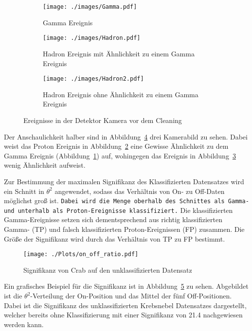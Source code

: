 \begin{figure}[H]
  \centering
\begin{subfigure}[t]{0.3\textwidth}
  \centering
  \texttt{[image: ./images/Gamma.pdf]}
  \caption{Gamma Ereignis}
  \label{fig:gammaevent}
\end{subfigure}
\begin{subfigure}[t]{0.3\textwidth}
  \centering
  \texttt{[image: ./images/Hadron.pdf]}
  \caption{Hadron Ereignis mit Ähnlichkeit zu einem Gamma Ereignis}
  \label{fig:hadevent}
\end{subfigure}
\begin{subfigure}[t]{0.3\textwidth}
  \centering
  \texttt{[image: ./images/Hadron2.pdf]}
  \caption{Hadron Ereignis ohne Ähnlichkeit zu einem Gamma Ereignis}
  \label{fig:had2event}
\end{subfigure}
\caption{Ereignisse in der Detektor Kamera vor dem Cleaning \cite{campic}}
\label{fig:picevents}
\end{figure}
Der Anschaulichkeit halber sind in Abbildung~\ref{fig:picevents} drei Kamerabild zu sehen.
Dabei weist das Proton Ereignis in Abbildung~\ref{fig:hadevent} eine Gewisse Ähnlichkeit zu dem Gamma Ereignis (Abbildung~\ref{fig:gammaevent}) auf, wohingegen das Ereignis in Abbildung~\ref{fig:had2event} wenig Ähnlichkeit aufweist.

Zur Bestimmung der maximalen Signifikanz des Klassifizierten Datensatzes wird ein Schnitt in $\theta^{2}$ angewendet, sodass das Verhältnis von On- zu Off-Daten möglichst groß ist.
\texttt{Dabei wird die Menge oberhalb des Schnittes als Gamma- und unterhalb als Proton-Ereignisse klassifiziert.} 
Die klassifizierten Gamma-Ereignisse setzen sich dementsprechend aus richtig klassifizierten Gamma- (TP) und falsch klassifizierten Proton-Ereignissen (FP) zusammen. 
Die Größe der Signifikanz wird durch das Verhältnis von TP zu FP bestimmt.
\begin{figure}[H]
  \centering
  \texttt{[image: ./Plots/on\_off\_ratio.pdf]}
  \caption{Signifikanz von Crab auf den unklassifizierten Datensatz}
  \label{fig:sig_crab}
\end{figure}
Ein grafisches Beispiel für die Signifikanz ist in Abbildung~\ref{fig:sig_crab} zu sehen. 
Abgebildet ist die $\theta^{2}$-Verteilung der On-Position und das Mittel der fünf Off-Positionen.
Dabei ist die Signifikanz des unklassifizierten Krebsnebel Datensatzes dargestellt, welcher bereits ohne Klassifizierung mit einer Signifikanz von \SI{21,4}{\sigma} nachgewiesen werden kann.

